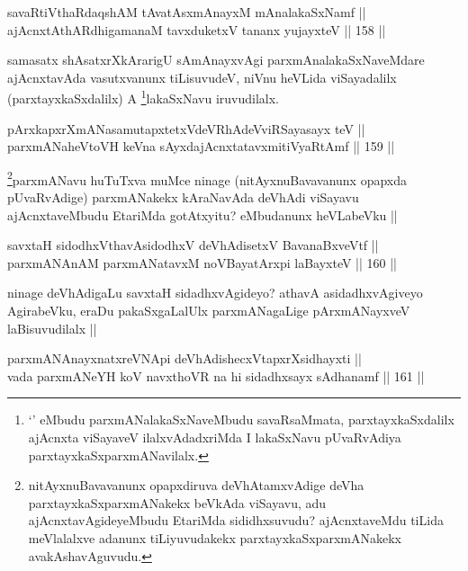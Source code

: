 \begin{shl}
savaRtiVthaRdaqshAM tAvatAsxmAnayxM mAnalakaSxNamf || \\
ajAcnxtAthARdhigamanaM tavxduketxV tananx yujayxteV ||  158 ||  
\end{shl}

\begin{artha}
samasatx shAsatxrXkArarigU sAmAnayxvAgi parxmAnalakaSxNaveMdare ajAcnxtavAda vasutxvanunx tiLisuvudeV, niVnu heVLida viSayadalilx (parxtayxkaSxdalilx) A \footnote{`\stext' eMbudu parxmANalakaSxNaveMbudu savaRsaMmata, parxtayxkaSxdalilx ajAcnxta viSayaveV ilalxvAdadxriMda I lakaSxNavu pUvaRvAdiya parxtayxkaSxparxmANavilalx.}lakaSxNavu iruvudilalx.
\end{artha}


\begin{shl}
pArxkapxrXmANasamutapxtetxVdeVRhAdeVviRSayasayx teV || \\
parxmANaheVtoVH keVna sAyxdajAcnxtatavxmitiVyaRtAmf ||  159 ||  
\end{shl}

\begin{artha}
\footnote[3]{nitAyxnuBavavanunx opapxdiruva deVhAtamxvAdige deVha parxtayxkaSxparxmANakekx beVkAda viSayavu, adu ajAcnxtavAgideyeMbudu EtariMda sididhxsuvudu? ajAcnxtaveMdu tiLida meVlalalxve adanunx tiLiyuvudakekx parxtayxkaSxparxmANakekx avakAshavAguvudu.}parxmANavu huTuTxva muMce ninage (nitAyxnuBavavanunx opapxda pUvaRvAdige) parxmANakekx kAraNavAda deVhAdi viSayavu ajAcnxtaveMbudu EtariMda gotAtxyitu? eMbudanunx heVLabeVku ||
\end{artha}

\begin{shl}
savxtaH sidodhxV\s thavA\s sidodhxV deVhAdisetxV BavanaBxveVtf ||  \\
parxmANAnAM parxmANatavxM noVBayatArxpi laBayxteV ||  160 ||  
\end{shl}

\begin{artha}
ninage deVhAdigaLu savxtaH sidadhxvAgideyo? athavA asidadhxvAgiveyo AgirabeVku, eraDu pakaSxgaLalUlx parxmANagaLige pArxmANayxveV laBisuvudilalx ||
\end{artha}

\begin{shl}
parxmANAnayxnatxreVNApi deVhAdishecxVtapxrXsidhayxti || \\
vada parxmANeYH koV navxthoVR na hi sidadhxsayx sAdhanamf ||  161 ||  
\end{shl}

